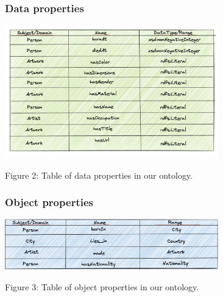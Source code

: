 \documentclass{article}
\begin{document}
\begin{center}
\subsubsection{Data properties}
\newline
\includegraphics[width=350]{dataproperties.png}
\newline
\caption{Figure 2: Table of data properties in our ontology.}

\newline
\subsubsection{Object properties}
\includegraphics[width=350]{objectproperties.png}
\newline
\caption{Figure 3: Table of object properties in our ontology.}

\newline

\end{center}
\end{document}
